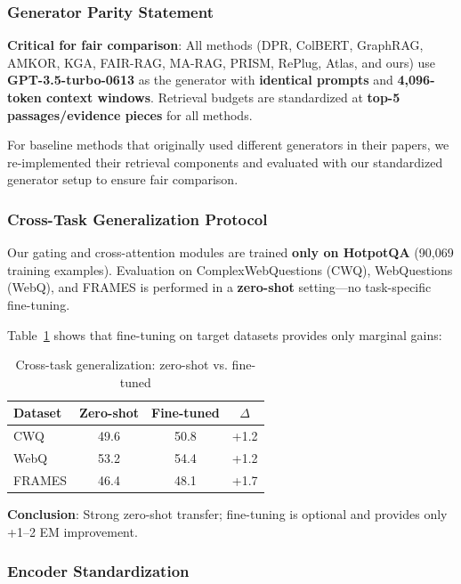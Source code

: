 \documentclass[10pt,twocolumn]{article}
\begin{document}
\subsubsection{Generator Parity Statement}
\label{sec:generator_parity}

\textbf{Critical for fair comparison}: All methods (DPR, ColBERT, GraphRAG, AMKOR, KGA, FAIR-RAG, MA-RAG, PRISM, RePlug, Atlas, and ours) use \textbf{GPT-3.5-turbo-0613} as the generator with \textbf{identical prompts} and \textbf{4,096-token context windows}. Retrieval budgets are standardized at \textbf{top-5 passages/evidence pieces} for all methods.

For baseline methods that originally used different generators in their papers, we re-implemented their retrieval components and evaluated with our standardized generator setup to ensure fair comparison.

\subsubsection{Cross-Task Generalization Protocol}
\label{sec:cross_task}

Our gating and cross-attention modules are trained \textbf{only on HotpotQA} (90,069 training examples). Evaluation on ComplexWebQuestions (CWQ), WebQuestions (WebQ), and FRAMES is performed in a \textbf{zero-shot} setting---no task-specific fine-tuning.

Table~\ref{tab:cross_task} shows that fine-tuning on target datasets provides only marginal gains:

\begin{table}[h]
\centering
\caption{Cross-task generalization: zero-shot vs. fine-tuned}
\label{tab:cross_task}
\small
\begin{tabular}{@{}lccc@{}}
\toprule
\textbf{Dataset} & \textbf{Zero-shot} & \textbf{Fine-tuned} & \textbf{$\Delta$} \\
\midrule
CWQ & 49.6 & 50.8 & +1.2 \\
WebQ & 53.2 & 54.4 & +1.2 \\
FRAMES & 46.4 & 48.1 & +1.7 \\
\bottomrule
\end{tabular}
\end{table}

\textbf{Conclusion}: Strong zero-shot transfer; fine-tuning is optional and provides only +1--2 EM improvement.


\subsubsection{Encoder Standardization}
\label{sec:encoder_standard}
\end{document}
